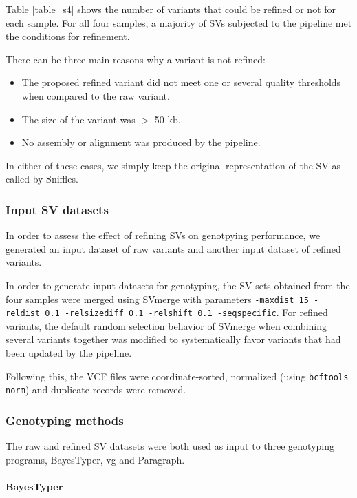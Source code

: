 \documentclass[12pt]{article}
\begin{document}
Table \ref{table_s4} shows the number of variants that could be refined or not for each sample.
For all four samples, a majority of SVs subjected to the pipeline met the conditions for refinement.

There can be three main reasons why a variant is not refined:

\begin{itemize}
	\item The proposed refined variant did not meet one or several quality thresholds when compared to the raw variant.
	\item The size of the variant was $>$ 50 kb.
	\item No assembly or alignment was produced by the pipeline.
\end{itemize}

In either of these cases, we simply keep the original representation of the SV as called by Sniffles.

\subsubsection{Input SV datasets}

In order to assess the effect of refining SVs on genotpying performance, we generated an input dataset of raw variants and another input dataset of refined variants.

In order to generate input datasets for genotyping, the SV sets obtained from the four samples were merged using SVmerge with parameters \texttt{-maxdist 15 -reldist 0.1 -relsizediff 0.1 -relshift 0.1 -seqspecific}.
For refined variants, the default random selection behavior of SVmerge when combining several variants together was modified to systematically favor variants that had been updated by the pipeline.

Following this, the VCF files were coordinate-sorted, normalized (using \texttt{bcftools norm}) and duplicate records were removed.

\subsubsection{Genotyping methods}

The raw and refined SV datasets were both used as input to three genotyping programs, BayesTyper, vg and Paragraph.

\paragraph{BayesTyper}
\end{document}
